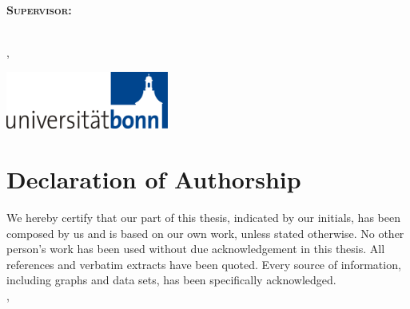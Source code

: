 \begin{titlepage}
	\centering
	
	\Large\scshape
	\infoInstitute\\
	\infoDepartment
	\vspace{0.17\textheight}\\
	
	\Huge\normalfont
	\infoTitleHead
	\vspace{0.3\baselineskip}\\
	\huge\bfseries
	\infoTitle
	\vspace{0.12\textheight}\\
	
	\Large
	\infoThesisType\\[0.3\baselineskip]
	\normalfont\large
	Supervisor:	\infoAdvisor
	\vspace{4\baselineskip}\\
	
	\Large
	\infoAuthorP
	
	\infoAuthorI
	\vspace{4\baselineskip}\\
	\infoLocation, \infoDate
	\vfill
	
	\includegraphics[width=0.4\textwidth]{images/uni_bonn_logo}
	
\end{titlepage}
\restoregeometry


\chapter*{Declaration of Authorship}

We hereby certify that our part of this thesis, indicated by our initials, has been composed by us and is based on our own work, unless stated otherwise.
No other person's work has been used without due acknowledgement in this thesis.
All references and verbatim extracts have been quoted.
Every source of information, including graphs and data sets, has been specifically acknowledged.
\vspace{4\baselineskip}\\
\infoLocation, \infoDate \hfill \infoAuthor
\vspace{4\baselineskip}\\


